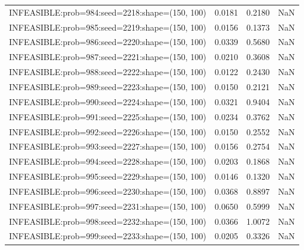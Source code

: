 \begin{longtable}{lccc}
INFEASIBLE:prob=984:seed=2218:shape=(150, 100) &   0.0181 &  0.2180 &    NaN \\
INFEASIBLE:prob=985:seed=2219:shape=(150, 100) &   0.0156 &  0.1373 &    NaN \\
INFEASIBLE:prob=986:seed=2220:shape=(150, 100) &   0.0339 &  0.5680 &    NaN \\
INFEASIBLE:prob=987:seed=2221:shape=(150, 100) &   0.0210 &  0.3608 &    NaN \\
INFEASIBLE:prob=988:seed=2222:shape=(150, 100) &   0.0122 &  0.2430 &    NaN \\
INFEASIBLE:prob=989:seed=2223:shape=(150, 100) &   0.0150 &  0.2121 &    NaN \\
INFEASIBLE:prob=990:seed=2224:shape=(150, 100) &   0.0321 &  0.9404 &    NaN \\
INFEASIBLE:prob=991:seed=2225:shape=(150, 100) &   0.0234 &  0.3762 &    NaN \\
INFEASIBLE:prob=992:seed=2226:shape=(150, 100) &   0.0150 &  0.2552 &    NaN \\
INFEASIBLE:prob=993:seed=2227:shape=(150, 100) &   0.0156 &  0.2754 &    NaN \\
INFEASIBLE:prob=994:seed=2228:shape=(150, 100) &   0.0203 &  0.1868 &    NaN \\
INFEASIBLE:prob=995:seed=2229:shape=(150, 100) &   0.0146 &  0.1320 &    NaN \\
INFEASIBLE:prob=996:seed=2230:shape=(150, 100) &   0.0368 &  0.8897 &    NaN \\
INFEASIBLE:prob=997:seed=2231:shape=(150, 100) &   0.0650 &  0.5999 &    NaN \\
INFEASIBLE:prob=998:seed=2232:shape=(150, 100) &   0.0366 &  1.0072 &    NaN \\
INFEASIBLE:prob=999:seed=2233:shape=(150, 100) &   0.0205 &  0.3326 &    NaN \\
\end{longtable}
